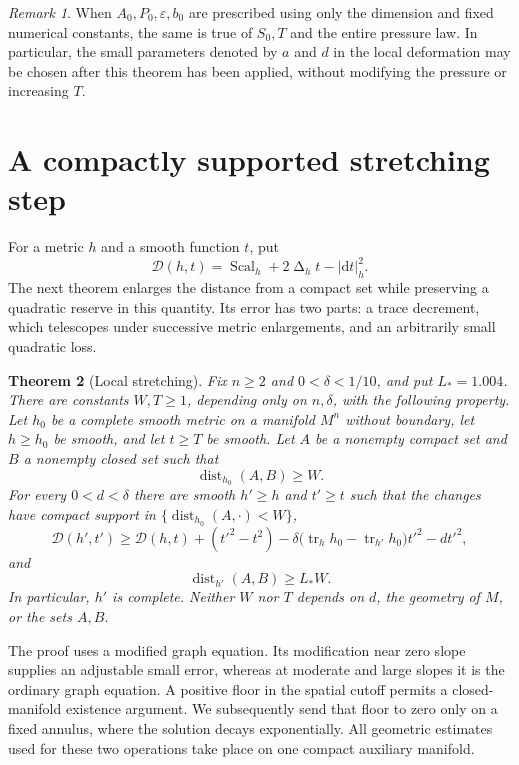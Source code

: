 \documentclass[11pt]{article}
\numberwithin{equation}{section}
\newtheorem{theorem}{Theorem}[section]
\theoremstyle{definition}
\theoremstyle{remark}
\newtheorem{remark}[theorem]{Remark}
\begin{document}
\begin{remark}\label{pressure:parameter-independence}
When $A_0,P_0,\varepsilon,b_0$ are prescribed using only the dimension and fixed
numerical constants, the same is true of $S_0,T$ and the entire pressure
law.  In particular, the small parameters denoted by $a$ and $d$ in the
local deformation may be chosen after this theorem has been applied,
without modifying the pressure or increasing $T$.
\end{remark}

\section{A compactly supported stretching step}
\label{step:section}

For a metric $h$ and a smooth function $t$, put
\[
 \mathcal D(h,t)=\operatorname{Scal}_h+2\operatorname{\Delta}_h t-|\mathrm d t|_h^2.
\]
The next theorem enlarges the distance from a compact set while preserving
a quadratic reserve in this quantity.  Its error has two parts: a trace
decrement, which telescopes under successive metric enlargements, and an
arbitrarily small quadratic loss.

\begin{theorem}[Local stretching]\label{step:main}
Fix $n\ge2$ and $0<\delta<1/10$, and put $L_*=1.004$.  There are
constants $W,T\ge1$, depending only on $n,\delta$, with the following
property.  Let $h_0$ be a complete smooth metric on a manifold $M^n$
without boundary, let $h\ge h_0$ be smooth, and let $t\ge T$ be smooth.
Let $A$ be a nonempty compact set and $B$ a nonempty closed set such that
\[
 \operatorname{dist}_{h_0}(A,B)\ge W.
\]
For every $0<d<\delta$ there are smooth $h'\ge h$ and $t'\ge t$ such that
the changes have compact support in $\{\operatorname{dist}_{h_0}(A,\cdot)<W\}$,
\begin{equation}\label{step:conclusion}
 \mathcal D(h',t')\ge \mathcal D(h,t)+(t'^2-t^2)
 -\delta\bigl(\operatorname{tr}_h h_0-\operatorname{tr}_{h'}h_0\bigr)t'^2-dt'^2,
\end{equation}
and
\begin{equation}\label{step:distance}
 \operatorname{dist}_{h'}(A,B)\ge L_*W.
\end{equation}
In particular, $h'$ is complete.  Neither $W$ nor $T$ depends on $d$,
the geometry of $M$, or the sets $A,B$.
\end{theorem}

The proof uses a modified graph equation.  Its modification near zero
slope supplies an adjustable small error, whereas at moderate and large
slopes it is the ordinary graph equation.  A positive floor in the spatial
cutoff permits a closed-manifold existence argument.  We subsequently send
that floor to zero only on a fixed annulus, where the solution decays
exponentially.  All geometric estimates used for these two operations
take place on one compact auxiliary manifold.
\end{document}
